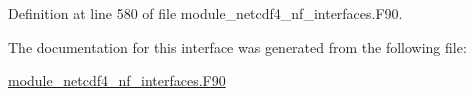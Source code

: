 Definition at line 580 of file module\+\_\+netcdf4\+\_\+nf\+\_\+interfaces.\+F90.



The documentation for this interface was generated from the following file\+:\begin{DoxyCompactItemize}
\item 
\hyperlink{module__netcdf4__nf__interfaces_8F90}{module\+\_\+netcdf4\+\_\+nf\+\_\+interfaces.\+F90}\end{DoxyCompactItemize}
